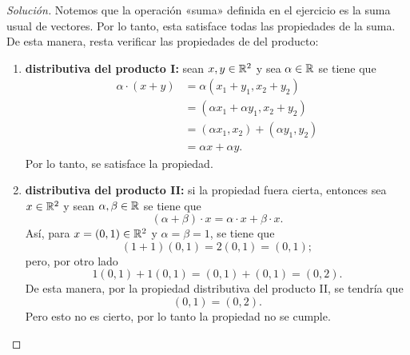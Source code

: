 \documentclass[a4,11pt]{aleph-notas}
\begin{document}
\begin{proof}[Solución]\hspace{0pt}
    Notemos que la operación «suma» definida en el ejercicio es la suma usual de vectores. Por lo tanto, esta satisface todas las propiedades de la suma. De esta manera, resta verificar las propiedades de del producto:
    \begin{enumerate}
    \item \textbf{distributiva del producto I:}
        sean $x,y\in \mathbb{R}^2$ y sea $\alpha\in \mathbb{R}$ se tiene que
        \begin{align*}
            \alpha\cdot (x + y) & = \alpha (x_1+y_1 , x_2 + y_2) \\
                & = (\alpha x_1 + \alpha y_1 , x_2 + y_2 ) \\
                & = (\alpha x_1,x_2) + (\alpha y_1,y_2) \\
                & = \alpha x + \alpha y.
        \end{align*}
        Por lo tanto, se satisface la propiedad.
    \item \textbf{distributiva del producto II:}
        si la propiedad fuera cierta, entonces sea $x\in \mathbb{R}^2$ y sean $\alpha,\beta\in \mathbb{R}$ se tiene que
        \[
            (\alpha+\beta)\cdot x=\alpha\cdot x + \beta\cdot x.
        \]
        Así, para $x=(0,1)\in\mathbb{R}^2$ y $\alpha=\beta=1$, se tiene que 
        \[
            (1 + 1)(0,1) = 2(0,1) = (0,1);
        \]
        pero, por otro lado 
        \[
            1 (0,1) + 1(0,1) = (0,1)+(0,1) = (0,2).
        \]
        De esta manera, por la propiedad distributiva del producto II, se tendría que 
        \[
            (0,1) = (0,2).
        \]
        Pero esto no es cierto, por lo tanto la propiedad no se cumple. 
        

\end{enumerate}
\end{proof}
\end{document}
